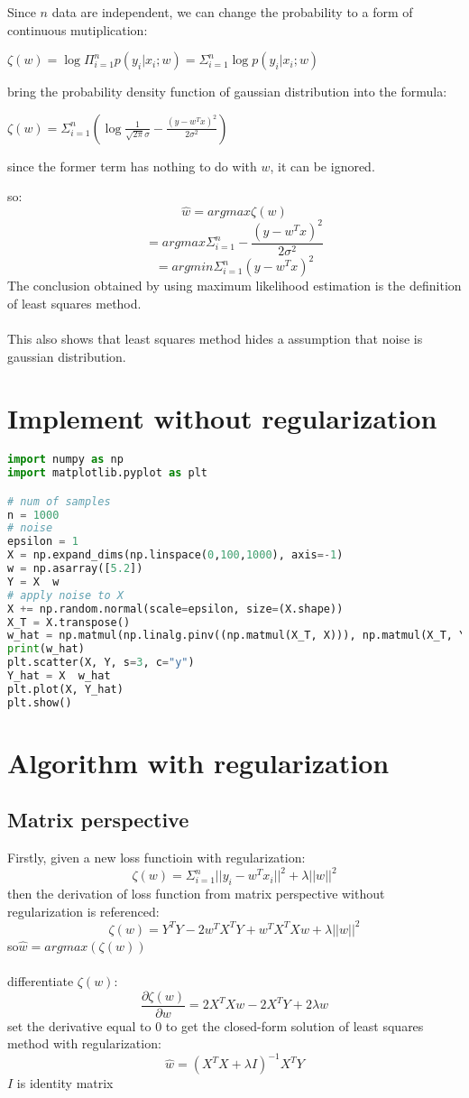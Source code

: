 \documentclass{report}
\begin{document}
Since $n$ data are independent, we can change the probability to a form of continuous mutiplication:

$\zeta(w)=\log{\Pi_{i=1}^np(y_i|x_i;w)}=\Sigma_{i=1}^n \log{p(y_i|x_i;w)}$

bring the probability density function of gaussian distribution into the formula:

$\zeta(w)=\Sigma_{i=1}^n(\log{\frac{1}{\sqrt{2\pi}\sigma}}-\frac{(y-w^Tx)^2}{2\sigma^2})$

since the former term has nothing to do with $w$, it can be ignored.

so:
$$
\hat{w}=argmax{\zeta(w)}
$$
$$
=argmax{ \Sigma_{i=1}^n -\frac{(y-w^Tx)^2}{2\sigma^2}}
$$
$$
=argmin{ \Sigma_{i=1}^n (y-w^Tx)^2}
$$
The conclusion obtained by using maximum likelihood estimation is the definition of least squares method.\\\\
This also shows that least squares method hides a assumption that noise is gaussian distribution.
\newpage
\section{Implement without regularization}
\begin{lstlisting}[language={python}]
%matplotlib inline
import numpy as np
import matplotlib.pyplot as plt

# num of samples
n = 1000
# noise
epsilon = 1
X = np.expand_dims(np.linspace(0,100,1000), axis=-1)
w = np.asarray([5.2])
Y = X  w
# apply noise to X
X += np.random.normal(scale=epsilon, size=(X.shape))
X_T = X.transpose()
w_hat = np.matmul(np.linalg.pinv((np.matmul(X_T, X))), np.matmul(X_T, Y))
print(w_hat)
plt.scatter(X, Y, s=3, c="y")
Y_hat = X  w_hat
plt.plot(X, Y_hat)
plt.show()
\end{lstlisting}
\section{Algorithm with regularization}
\subsection{Matrix perspective}
Firstly, given a new loss functioin with regularization:
$$
\zeta(w)=\Sigma_{i=1}^{n}||y_i-w^T  x_i||^2 + \lambda  ||w||^2
$$
then the derivation of loss function from matrix perspective without regularization is referenced:
$$
\zeta(w)=Y^TY-2w^TX^TY+w^TX^TX w+\lambda  ||w||^2
$$
so$\hat{w}=argmax(\zeta(w))$\\\\
differentiate $\zeta(w)$:
$$
\frac{\partial \zeta(w)}{\partial w}=2X^TXw-2X^T Y+2\lambda  w 
$$
set the derivative equal to 0 to get the closed-form solution of least squares method with regularization:
$$
\hat{w}=(X^TX+\lambda  I)^{-1} X^TY
$$
$I$ is identity matrix
\end{document}
